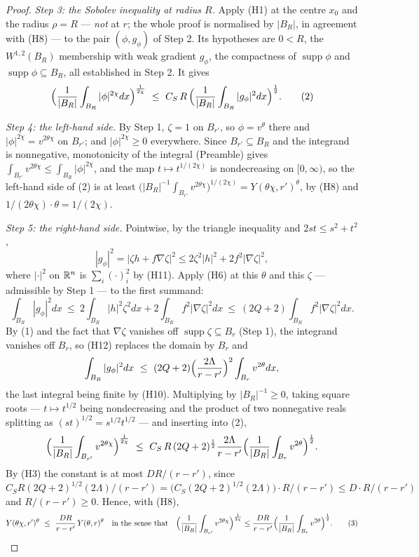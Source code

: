 \begin{proof}
\emph{Step 3: the Sobolev inequality at radius $R$.}  Apply (H1) at the centre
$x_0$ and the radius $\rho=R$ --- \emph{not} at $r$; the whole proof is
normalised by $|B_R|$, in agreement with (H8) --- to the pair
$(\phi,g_\phi)$ of Step 2.  Its hypotheses are $0<R$, the $W^{1,2}(B_R)$
membership with weak gradient $g_\phi$, the compactness of
$\operatorname{supp}\phi$ and $\operatorname{supp}\phi\subseteq B_R$, all
established in Step 2.  It gives
\[
\Bigl(\frac1{|B_R|}\int_{B_R}|\phi|^{2\chi}dx\Bigr)^{\frac1{2\chi}}
\ \le\ C_S\,R\,\Bigl(\frac1{|B_R|}\int_{B_R}|g_\phi|^2dx\Bigr)^{\frac12}.
\tag{2}
\]

\emph{Step 4: the left-hand side.}  By Step 1, $\zeta=1$ on $B_{r'}$, so
$\phi=v^\theta$ there and $|\phi|^{2\chi}=v^{2\theta\chi}$ on $B_{r'}$; and
$|\phi|^{2\chi}\ge0$ everywhere.  Since $B_{r'}\subseteq B_R$ and the
integrand is nonnegative, monotonicity of the integral (Preamble) gives
$\int_{B_{r'}}v^{2\theta\chi}\le\int_{B_R}|\phi|^{2\chi}$, and the map
$t\mapsto t^{1/(2\chi)}$ is nondecreasing on $[0,\infty)$, so the left-hand
side of (2) is at least
$\bigl(|B_R|^{-1}\int_{B_{r'}}v^{2\theta\chi}\bigr)^{1/(2\chi)}
=Y(\theta\chi,r')^{\theta}$, by (H8) and $1/(2\theta\chi)\cdot\theta
=1/(2\chi)$.

\emph{Step 5: the right-hand side.}  Pointwise, by the triangle inequality and
$2st\le s^2+t^2$,
\[
|g_\phi|^2=|\zeta h+f\nabla\zeta|^2\le2\zeta^2|h|^2+2f^2|\nabla\zeta|^2 ,
\]
where $|\cdot|^2$ on $\mathbb{R}^n$ is $\sum_i(\cdot)_i^2$ by (H11).  Apply (H6) at this
$\theta$ and this $\zeta$ --- admissible by Step 1 --- to the first summand:
\[
\int_{B_R}|g_\phi|^2dx
\ \le\ 2\int_{B_R}|h|^2\zeta^2dx+2\int_{B_R}f^2|\nabla\zeta|^2dx
\ \le\ (2Q+2)\int_{B_R}f^2|\nabla\zeta|^2dx .
\]
By (1) and the fact that $\nabla\zeta$ vanishes off
$\operatorname{supp}\zeta\subseteq B_r$ (Step 1), the integrand vanishes off
$B_r$, so (H12) replaces the domain by $B_r$ and
\[
\int_{B_R}|g_\phi|^2dx
\ \le\ (2Q+2)\Bigl(\frac{2\Lambda}{r-r'}\Bigr)^2\int_{B_r}v^{2\theta}dx ,
\]
the last integral being finite by (H10).  Multiplying by $|B_R|^{-1}\ge0$,
taking square roots --- $t\mapsto t^{1/2}$ being nondecreasing and the product
of two nonnegative reals splitting as $(st)^{1/2}=s^{1/2}t^{1/2}$ --- and
inserting into (2),
\[
\Bigl(\frac1{|B_R|}\int_{B_{r'}}v^{2\theta\chi}\Bigr)^{\frac1{2\chi}}
\ \le\ C_S\,R\,(2Q+2)^{\frac12}\frac{2\Lambda}{r-r'}
\Bigl(\frac1{|B_R|}\int_{B_r}v^{2\theta}\Bigr)^{\frac12} .
\]
By (H3) the constant is at most $DR/(r-r')$, since
$C_S R(2Q+2)^{1/2}(2\Lambda)/(r-r')
=\bigl(C_S(2Q+2)^{1/2}(2\Lambda)\bigr)\cdot R/(r-r')
\le D\cdot R/(r-r')$ and $R/(r-r')\ge0$.  Hence, with (H8),
\[
Y(\theta\chi,r')^{\theta}\ \le\ \frac{DR}{r-r'}\,Y(\theta,r)^{\theta}
\quad\text{in the sense that}\quad
\Bigl(\frac1{|B_R|}\int_{B_{r'}}v^{2\theta\chi}\Bigr)^{\frac1{2\chi}}
\le\frac{DR}{r-r'}\Bigl(\frac1{|B_R|}\int_{B_r}v^{2\theta}\Bigr)^{\frac12}.
\tag{3}
\]


\end{proof}
